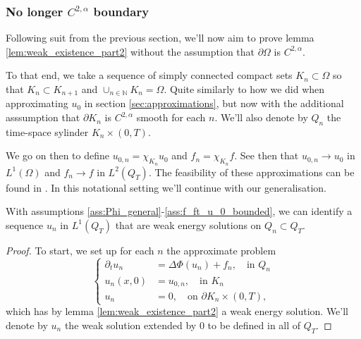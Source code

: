 \documentclass[11pt, a4paper]{article}
\begin{document}


\subsubsection{No longer $C^{2,\alpha}$ boundary}
Following suit from the previous section, we'll now aim to prove lemma \ref{lem:weak_existence_part2} without the assumption that $\partial \Omega$ is $C^{2,\alpha}$.

To that end, we take a sequence of simply connected compact sets $K_n \subset \Omega$ so that $K_n \subset K_{n+1}$ and $\cup_{n \in \mathbb{N}}K_n = \Omega$. Quite similarly to how we did when approximating $u_0$ in section \ref{sec:approximations}, but now with the additional asssumption that $\partial K_n$ is $C^{2,\alpha}$ smooth for each $n$. We'll also denote by $Q_n$ the time-space sylinder $K_n \times (0,T)$. 

We go on then to define $u_{0,n} = \chi_{K_n} u_0$ and $f_n = \chi_{K_n} f$. See then that $u_{0,n} \to u_0$ in $L^1(\Omega)$ and $f_n \to f$ in $L^2(Q_T)$. The feasibility of these approximations can be found in \citep[Sec. 5.3]{evans}. In this notational setting we'll continue with our generalisation.

\begin{proposition}
\label{prop:sequence_weak_solution_nonsmoothboundary}
With assumptions \ref{ass:Phi_general}-\ref{ass:f_ft_u_0_bounded}, we can identify a sequence $u_n$ in $L^1(Q_T)$ that are weak energy solutions on $Q_n \subset Q_T$. 
\end{proposition}
\begin{proof}
To start, we set up for each $n$ the approximate problem
\begin{equation}
\begin{cases}
\partial_t u_n &= \Delta \Phi(u_n) + f_n, \quad \text{in } Q_n \\
u_n(x,0) &= u_{0,n}, \quad \text{in } K_n \\
u_n &= 0, \quad \text{on } \partial K_n \times (0,T), 
\end{cases}
\end{equation}
which has by lemma \ref{lem:weak_existence_part2} a weak energy solution. We'll denote by $u_n$ the weak solution extended by $0$ to be defined in all of $Q_T$.
\end{proof}
\end{document}

